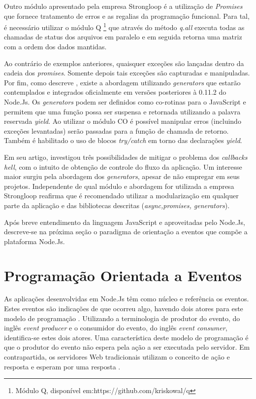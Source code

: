   Outro módulo apresentado pela empresa Strongloop é a utilização de \textit{Promises} que fornece tratamento de erros
  e as regalias da programação funcional. Para tal, é necessário utilizar o módulo Q \footnote{Módulo Q, disponível em:https://github.com/kriskowal/q}
  que através do método \textit{q.all} executa todas as chamadas de status dos arquivos em paralelo e em seguida retorna uma matriz
  com a ordem dos dados mantidas. 
  
  Ao contrário de exemplos anteriores, quaisquer exceções são lançadas dentro da cadeia dos
  \textit{promises}. Somente depois tais exceções são capturadas e manipuladas.
  Por fim, como descreve , existe a abordagem utilizando \textit{generators} que estarão
  contemplados e integrados oficialmente em versões posteriores à 0.11.2 do Node.Js. Os \textit{generators} podem ser definidos
  como co-rotinas para o JavaScript e permitem que uma função possa ser suspensa e retornada
  utilizando a palavra reservada \textit{yield}. Ao utilizar o módulo CO é possível manipular erros (incluindo exceções levantadas)
  serão passadas para a função de chamada de retorno. Também é habilitado o uso de blocos \textit{try/catch} em torno das 
  declarações \textit{yield}.
  
  Em seu artigo,  investigou três possibilidades de mitigar o problema dos \textit{callbacks hell}, com o 
  intuito de obtenção de controle do fluxo da aplicação. Um interesse maior surgiu pela abordagem dos \textit{generators},
  apesar de não empregar em seus projetos. Independente de qual módulo e abordagem for utilizada a empresa Strongloop reafirma que é recomendado
  utilizar a modularização em qualquer parte da aplicação e das bibliotecas descritas (\textit{async,promises, generators}).
  
  Após breve entendimento da linguagem JavaScript e aproveitadas pelo Node.Js, descreve-se na próxima seção
  o paradigma de orientação a eventos que compõe a plataforma Node.Js.
  
  
\section{Programação Orientada a Eventos}
\label{programacao-orientada-a-eventos}

  
  As aplicações desenvolvidas em Node.Js têm como núcleo e referência os eventos. Estes eventos são indicações de que ocorreu algo, 
  havendo dois atores para este modelo de programação \cite{oliveira}. Utilizando a terminologia de produtor do evento, 
  do inglês \textit{event producer} e o consumidor do evento, do inglês \textit{event consumer}, identifica-se estes dois atores. 
  Uma característica deste modelo de programação é que o produtor do evento não espera pela ação a ser executada  pelo servidor. 
  Em contrapartida, os servidores Web tradicionais utilizam o conceito de ação e resposta e esperam por uma resposta \cite{junior}.
  
